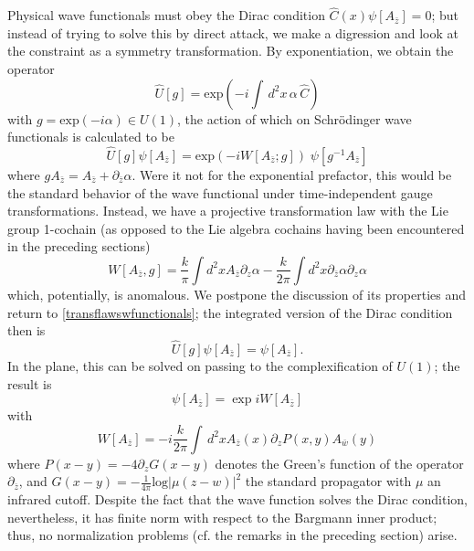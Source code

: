 \documentclass[a4paper,10pt]{article}
\begin{document}
Physical wave functionals must obey the Dirac condition $\hat{C}(x)\psi[A_{\bar{z}}]=0$;  
but instead of trying to solve this by direct attack, we make a digression and look at 
the constraint as a symmetry transformation. By exponentiation, we obtain the operator
\begin{equation}\hat{U}[g]=\mathrm{exp}(-i\int\,d^2x\,\alpha\,\hat{C}) \end{equation}
with $g=\mathrm{exp}(-i\alpha)\in U(1)$, the action of which on Schr\"{o}dinger wave 
functionals is calculated to be
\begin{equation}\label{transflawswfunctionals}
\hat{U}[g]\psi[A_{\bar{z}}]=\mathrm{exp}(-iW[A_{\bar{z}};g])\;
\psi[g^{-1}A_{\bar{z}}]
\end{equation}
where $g A_{\bar{z}}=A_{\bar{z}}+\partial_{\bar{z}}\alpha$. Were it not for the 
exponential prefactor, this would be the standard behavior of the wave functional under 
time-independent gauge transformations. Instead, we have a projective transformation law 
with the Lie group 1-cochain (as opposed to the Lie algebra cochains having been 
encountered in the preceding sections)
\begin{equation}
W[A_{\bar{z}},g]=\frac{k}{\pi}\int d^2x 
A_{\bar{z}}\partial_z\alpha-
\frac{k}{2\pi}\int d^2x \partial_{\bar{z}}\alpha\partial_z\alpha
\end{equation}
which, potentially, is anomalous. We postpone the discussion of its properties and return 
to \eqref{transflawswfunctionals}; the integrated version of the Dirac condition then is
\begin{equation}
\hat{U}[g]\psi[A_{\bar{z}}]=\psi[A_{\bar{z}}].
\end{equation}
In the plane, this can be solved on passing to the complexification of $U(1)$; the result 
is 
\begin{equation}
\psi[A_{\bar{z}}]=\exp iW[A_{\bar{z}}]
\end{equation}
with
\begin{equation}
W[A_{\bar{z}}]=-i\frac{k}{2\pi}\int\,d^2xA_{\bar{z}}(x)\partial_zP(x,y)A_{\bar{w}}(y)
\end{equation}
where $P(x-y)=-4\partial_zG(x-y)$ denotes the Green's function of the operator 
$\partial_{\bar{z}}$, and $G(x-y)=-\frac{1}{4\pi}\mathrm{log}|\mu(z-w)|^2$ the standard 
propagator with $\mu$ an infrared cutoff. Despite the fact that the wave function solves 
the Dirac condition, nevertheless, it has finite norm with respect to the Bargmann inner 
product; thus, no normalization problems (cf. the remarks in the preceding section) 
arise.
\end{document}

